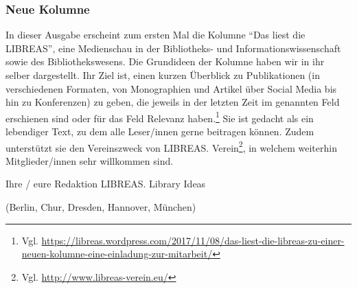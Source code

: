 \documentclass[a4paper,
fontsize=11pt,
oneside,
numbers=noperiodatend,
parskip=half-,
bibliography=totoc,
final
]{scrartcl}
\begin{document}
\hypertarget{neue-kolumne}{%
\subsubsection{Neue Kolumne}\label{neue-kolumne}}

In dieser Ausgabe erscheint zum ersten Mal die Kolumne \enquote{Das
liest die LIBREAS}, eine Medienschau in der Bibliotheks- und
Informationswissenschaft sowie des Bibliothekswesens. Die Grundideen der
Kolumne haben wir in ihr selber dargestellt. Ihr Ziel ist, einen kurzen
Überblick zu Publikationen (in verschiedenen Formaten, von Monographien
und Artikel über Social Media bis hin zu Konferenzen) zu geben, die
jeweils in der letzten Zeit im genannten Feld erschienen sind oder für
das Feld Relevanz haben.\footnote{Vgl.
  \url{https://libreas.wordpress.com/2017/11/08/das-liest-die-libreas-zu-einer-neuen-kolumne-eine-einladung-zur-mitarbeit/}}
Sie ist gedacht als ein lebendiger Text, zu dem alle Leser/innen gerne
beitragen können. Zudem unterstützt sie den Vereinszweck von LIBREAS.
Verein\footnote{Vgl. \url{http://www.libreas-verein.eu/}}, in welchem
weiterhin Mitglieder/innen sehr willkommen sind.

Ihre / eure Redaktion LIBREAS. Library Ideas

(Berlin, Chur, Dresden, Hannover, München)

\end{document}
